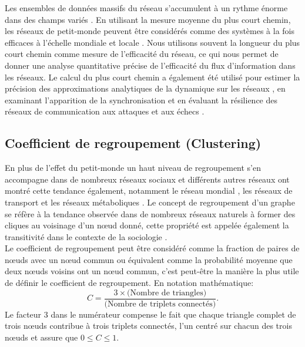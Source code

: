 Les ensembles de données massifs du réseau s'accumulent à un rythme énorme dans des champs variés \cite{Qi-al2010}. En utilisant la mesure moyenne du plus court chemin, les réseaux de petit-monde peuvent être considérés comme des systèmes à la fois efficaces à l'échelle mondiale et locale \cite{Latora-Marchiori2001}. Nous utilisons souvent la longueur du plus court chemin comme mesure de l'efficacité du réseau, ce qui nous permet de donner une analyse quantitative précise de l'efficacité du flux d'information dans les réseaux. Le calcul du plus court chemin a également été utilisé pour estimer la précision des approximations analytiques de la dynamique sur les réseaux \cite{Melnik-al2011}, en examinant l'apparition de la synchronisation \cite{Zhao-al2006} et en évaluant la résilience des réseaux de communication aux attaques et aux échecs \cite{Albert-al2000}.

\subsection{Coefficient de regroupement (Clustering)}
En plus de l'effet du petit-monde un haut niveau de regroupement s'en accompagne dans de nombreux
réseaux sociaux et différents autres réseaux ont montré cette tendance également, notamment le réseau mondial \cite{Lad1999}, les réseaux de transport \cite{Seb-al2022} et les réseaux métaboliques \cite{WD2000,SC2001}.
Le concept de regroupement d'un graphe
se réfère à la tendance observée dans de nombreux réseaux naturels à former des cliques au voisinage d'un nœud donné, 
cette propriété est appelée également la transitivité dans le contexte de la sociologie \cite{Wa1994}.\\
Le coefficient de regroupement peut être considéré comme la fraction de paires de nœuds avec un nœud commun
ou équivalent comme la probabilité moyenne que deux nœuds voisins ont un nœud commun, c'est peut-\^{e}tre la manière
la plus utile de définir le coefficient de regroupement. En notation mathématique:
\begin{equation}
C=\frac{3\times\text{(Nombre de triangles)}}{\text{(Nombre de triplets connectés)}}
\label{Clustering}.
\end{equation}
Le facteur $3$ dans le numérateur compense le fait que chaque triangle complet de trois nœuds contribue à trois triplets
connectés, l'un centré sur chacun des trois nœuds et assure que $0\leq C\leq 1$.

